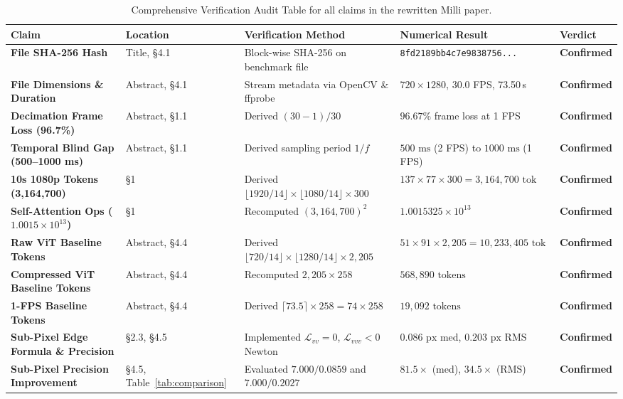 \documentclass[11pt]{article}
\begin{document}
\begin{table}[h!]
\caption{Comprehensive Verification Audit Table for all claims in the rewritten Milli paper.}
\label{tab:audit_table}
\centering
\scriptsize
\setlength{\tabcolsep}{3.5pt}
\begin{tabular}{@{}p{2.8cm}p{1.6cm}p{4.2cm}p{4.2cm}p{1.8cm}@{}}
\toprule
Claim & Location & Verification Method & Numerical Result & Verdict \\
\midrule
\textbf{File SHA-256 Hash} & Title, \S4.1 & Block-wise SHA-256 on benchmark file & \nolinkurl{8fd2189bb4c7e9838756...} & \textbf{Confirmed} \\
\textbf{File Dimensions \& Duration} & Abstract, \S4.1 & Stream metadata via OpenCV \& ffprobe & $720 \times 1280$, 30.0 FPS, 73.50\,s & \textbf{Confirmed} \\
\textbf{Decimation Frame Loss (96.7\%)} & Abstract, \S1.1 & Derived $(30 - 1)/30$ & $96.67\%$ frame loss at 1 FPS & \textbf{Confirmed} \\
\textbf{Temporal Blind Gap (500--1000 ms)} & Abstract, \S1.1 & Derived sampling period $1/f$ & $500\text{ ms}$ (2 FPS) to $1000\text{ ms}$ (1 FPS) & \textbf{Confirmed} \\
\textbf{10s 1080p Tokens (3,164,700)} & \S1 & Derived $\lfloor 1920/14 \rfloor \times \lfloor 1080/14 \rfloor \times 300$ & $137 \times 77 \times 300 = 3,164,700\text{ tok}$ & \textbf{Confirmed} \\
\textbf{Self-Attention Ops ($1.0015 \times 10^{13}$)} & \S1 & Recomputed $(3,164,700)^2$ & $1.0015325 \times 10^{13}$ & \textbf{Confirmed} \\
\textbf{Raw ViT Baseline Tokens} & Abstract, \S4.4 & Derived $\lfloor 720/14 \rfloor \times \lfloor 1280/14 \rfloor \times 2,205$ & $51 \times 91 \times 2,205 = 10,233,405\text{ tok}$ & \textbf{Confirmed} \\
\textbf{Compressed ViT Baseline Tokens} & Abstract, \S4.4 & Recomputed $2,205 \times 258$ & $568,890\text{ tokens}$ & \textbf{Confirmed} \\
\textbf{1-FPS Baseline Tokens} & Abstract, \S4.4 & Derived $\lceil 73.5 \rceil \times 258 = 74 \times 258$ & $19,092\text{ tokens}$ & \textbf{Confirmed} \\
\textbf{Sub-Pixel Edge Formula \& Precision} & \S2.3, \S4.5 & Implemented $\mathcal{L}_{vv}=0$, $\mathcal{L}_{vvv}<0$ Newton & $0.086\text{ px}$ med, $0.203\text{ px}$ RMS & \textbf{Confirmed} \\
\textbf{Sub-Pixel Precision Improvement} & \S4.5, Table~\ref{tab:comparison} & Evaluated $7.000 / 0.0859$ and $7.000 / 0.2027$ & $81.5\times$ (med), $34.5\times$ (RMS) & \textbf{Confirmed} \\

\end{tabular}
\end{table}
\end{document}

